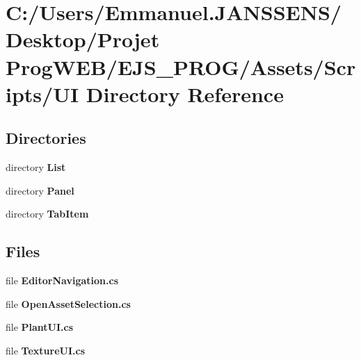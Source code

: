 \section{C\+:/\+Users/\+Emmanuel.J\+A\+N\+S\+S\+E\+N\+S/\+Desktop/\+Projet Prog\+W\+E\+B/\+E\+J\+S\+\_\+\+P\+R\+O\+G/\+Assets/\+Scripts/\+UI Directory Reference}
\label{dir_cf3cba7cb859b249fb665d794c791dc5}
\subsection*{Directories}
\begin{DoxyCompactItemize}
\item 
directory \textbf{ List}
\item 
directory \textbf{ Panel}
\item 
directory \textbf{ Tab\+Item}
\end{DoxyCompactItemize}
\subsection*{Files}
\begin{DoxyCompactItemize}
\item 
file \textbf{ Editor\+Navigation.\+cs}
\item 
file \textbf{ Open\+Asset\+Selection.\+cs}
\item 
file \textbf{ Plant\+U\+I.\+cs}
\item 
file \textbf{ Texture\+U\+I.\+cs}
\end{DoxyCompactItemize}
